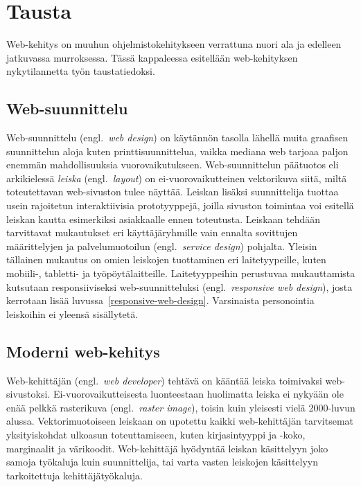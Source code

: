 \documentclass[finnish, 12pt, a4paper, elec, utf8, a-1b, online]{aaltothesis}
\begin{document}
\clearpage

\section{Tausta}

Web-kehitys on muuhun ohjelmistokehitykseen verrattuna nuori ala ja
edelleen jatkuvassa murroksessa. Tässä kappaleessa esitellään web-kehityksen
nykytilannetta työn taustatiedoksi.

\subsection{Web-suunnittelu}

Web-suunnittelu (engl.\ \textit{web design}) on käytännön tasolla lähellä muita
graafisen suunnittelun aloja kuten printtisuunnittelua, vaikka mediana web
tarjoaa paljon enemmän mahdollisuuksia vuorovaikutukseen. Web-suunnittelun
päätuotos eli arkikielessä \textit{leiska} (engl.\ \textit{layout}) on
ei-vuorovaikutteinen vektorikuva siitä, miltä toteutettavan web-sivuston tulee
näyttää. Leiskan lisäksi suunnittelija tuottaa usein rajoitetun interaktiivisia
prototyyppejä, joilla sivuston toimintaa voi esitellä leiskan kautta esimerkiksi
asiakkaalle ennen toteutusta. Leiskaan tehdään tarvittavat mukautukset eri
käyttäjäryhmille vain ennalta sovittujen määrittelyjen ja palvelumuotoilun
(engl.\ \textit{service design}) pohjalta. Yleisin tällainen mukautus on omien
leiskojen tuottaminen eri laitetyypeille, kuten mobiili-, tabletti- ja
työpöytälaitteille. Laitetyyppeihin perustuvaa mukauttamista kutsutaan
responsiiviseksi web-suunnitteluksi (engl.\ \textit{responsive web design}),
josta kerrotaan lisää luvussa~\ref{responsive-web-design}. Varsinaista
personointia leiskoihin ei yleensä sisällytetä.

\subsection{Moderni web-kehitys}

Web-kehittäjän (engl.\ \textit{web developer}) tehtävä on kääntää
leiska toimivaksi web-sivustoksi. Ei-vuorovaikutteisesta luonteestaan
huolimatta leiska ei nykyään ole enää pelkkä rasterikuva (engl.\ \textit{raster
image}), toisin kuin yleisesti vielä 2000-luvun alussa. Vektorimuotoiseen
leiskaan on upotettu kaikki web-kehittäjän tarvitsemat yksityiskohdat
ulkoasun toteuttamiseen, kuten kirjasintyyppi ja -koko, marginaalit ja
värikoodit. Web-kehittäjä hyödyntää leiskan käsittelyyn joko samoja
työkaluja kuin suunnittelija, tai varta vasten leiskojen käsittelyyn
tarkoitettuja kehittäjätyökaluja.
\end{document}
